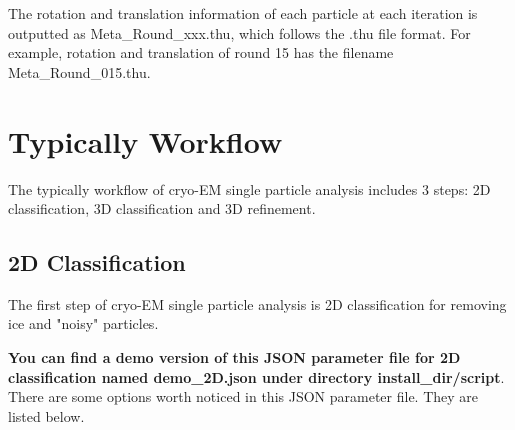 \documentclass{article}
\begin{document}
        The rotation and translation information of each particle at each iteration is outputted as \textsf{Meta\_Round\_xxx.thu}, which follows the \textsf{.thu} file format. For example, rotation and translation of round 15 has the filename \textsf{Meta\_Round\_015.thu}.
        
    \section{Typically Workflow}
    
        The typically workflow of cryo-EM single particle analysis includes 3 steps: 2D classification, 3D classification and 3D refinement. 
        
        \subsection{2D Classification}
        
        The first step of cryo-EM single particle analysis is 2D classification for removing ice and "noisy" particles.
        
        \textbf{You can find a demo version of this JSON parameter file for 2D classification named \textsf{demo\_2D.json} under directory \textsf{install\_dir/script}}. There are some options worth noticed in this JSON parameter file. They are listed below.
        
\end{document}
